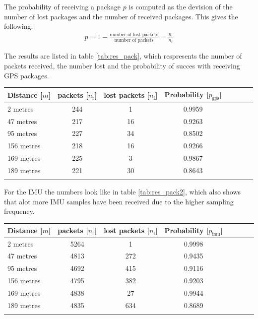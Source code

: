 The probability of receiving a package $p$ is computed as the devision of the number of lost packages and the number of received packages. This gives the following:
\begin{align}
p = 1 - \frac{\text{number of lost packets}}{\text{number of packets}} = \frac{n_\text{l}}{n_\text{r}}
\end{align}

The results are listed in table \vref{tab:res_pack}, which respresents the number of packets received, the number lost and the probability of succes with receiving GPS packages.\\

\begin{tabular}{l*{6}{c}r}
Distance [$m$]             & packets [$n_\text{r}$] & lost packets [$n_\text{l}$] & Probability [$p_\text{gps}$]\\
\hline
2 metres & 244 & 1 & 0.9959\\
47 metres & 217 & 16 & 0.9263\\
95 metres & 227 & 34 & 0.8502\\
156 metres & 218 & 16 & 0.9266\\
169 metres & 225 & 3 & 0.9867\\
189 metres & 221 & 30 & 0.8643\\
\label{tab:res_pack}
\end{tabular}

For the IMU the numbers look like in table \vref{tab:res_pack2}, which also shows that alot more IMU samples have been received due to the higher sampling frequency.\\
\begin{tabular}{l*{6}{c}r}
Distance [$m$] &  packets [$n_\text{r}$] & lost packets [$n_\text{l}$] & Probability [$p_\text{imu}$]\\
\hline
2 metres & 5264 & 1 & 0.9998\\
47 metres & 4813 & 272 & 0.9435\\
95 metres & 4692 & 415 & 0.9116\\
156 metres & 4795 & 382 & 0.9203\\
169 metres & 4838 & 27 & 0.9944\\
189 metres & 4835 & 634 & 0.8689\\
\label{tab:res_pack2}
\end{tabular}


